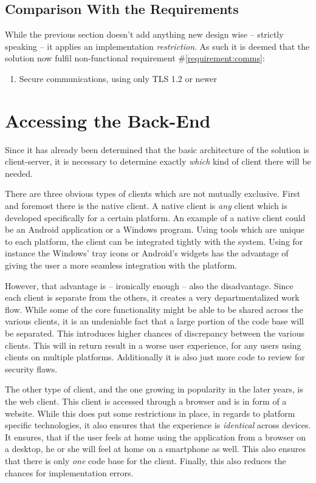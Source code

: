 		\subsection{Comparison With the Requirements}
			\label{requirement:fulfilled:comms}
			While the previous section doesn't add anything new design wise -- strictly speaking -- it applies an implementation \emph{restriction}. As such it is deemed that the solution now fulfil non-functional requirement \#\ref{requirement:comms}:
			\vspace{-3ex}\begin{enumerate}
				\setlength\itemsep{0.1em}
				\item Secure communications, using only TLS 1.2 or newer 
			\end{enumerate}

	\section{Accessing the Back-End}
		Since it has already been determined that the basic architecture of the solution is client-server, it is necessary to determine exactly \emph{which} kind of client there will be needed. 

		There are three obvious types of clients which are not mutually exclusive. First and foremost there is the native client. A native client is \emph{any} client which is developed specifically for a certain platform. An example of a native client could be an Android application or a Windows program. Using tools which are unique to each platform, the client can be integrated tightly with the system. Using for instance the Windows' tray icons or Android's widgets has the advantage of giving the user a more seamless integration with the platform. 

		However, that advantage is -- ironically enough -- also the disadvantage. Since each client is separate from the others, it creates a very departmentalized work flow. While some of the core functionality might be able to be shared across the various clients, it is an undeniable fact that a large portion of the code base will be separated. This introduces higher chances of discrepancy between the various clients. This will in return result in a worse user experience, for any users using clients on multiple platforms. Additionally it is also just more code to review for security flaws.

		The other type of client, and the one growing in popularity in the later years, is the web client. This client is accessed through a browser and is in form of a website. While this does put some restrictions in place, in regards to platform specific technologies, it also ensures that the experience is \emph{identical} across devices. It ensures, that if the user feels at home using the application from a browser on a desktop, he or she will feel at home on a smartphone as well. This also ensures that there is only \emph{one} code base for the client. Finally, this also reduces the chances for implementation errors.

